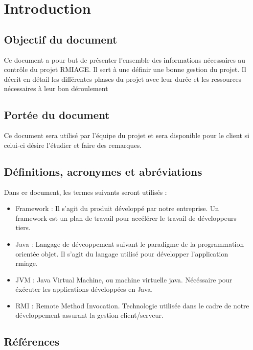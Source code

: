 \section{Introduction}
\subsection{Objectif du document}
Ce document a pour but de présenter l'ensemble des informations nécessaires au
contrôle du projet RMIAGE. Il sert à une définir une bonne gestion du projet.
Il décrit en détail les différentes phases du projet avec leur durée et les ressources nécessaires à leur bon 	déroulement

\subsection{Portée du document}
Ce document sera utilisé par l’équipe du projet et sera disponible pour le client si celui-ci désire l’étudier et faire des remarques. 

\subsection{Définitions, acronymes et abréviations}
Dans ce document, les termes suivants seront utilisés :
\begin{itemize}
	\item Framework :
Il s'agit du produit développé par notre entreprise. Un framework est un plan de travail pour accélérer le travail de développeurs tiers.
	\item Java :
Langage de déveoppement suivant le paradigme de la programmation orientée objet. Il s'agit du langage utilisé pour développer l'application rmiage.
	\item JVM :
Java Virtual Machine, ou machine virtuelle java. Nécéssaire pour éxécuter les applications développées en Java.
	\item RMI :
Remote Method Invocation. Technologie utilisée dans le cadre de notre développement assurant
la gestion client/serveur.
\end{itemize}

\subsection{Références}
